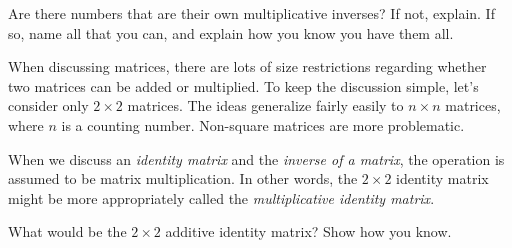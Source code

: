 \documentclass[space,handout,nooutcomes]{ximera}
\begin{document}
\begin{question}
Are there numbers that are their own multiplicative inverses?  If not, explain.  If so, name all that you can, and explain how you know you have them all.
\end{question}

When discussing matrices, there are lots of size restrictions
regarding whether two matrices can be added or multiplied.  To keep
the discussion simple, let's consider only $2\times 2$ matrices.  The
ideas generalize fairly easily to $n\times n$ matrices, where $n$ is a
counting number.  Non-square matrices are more problematic.

When we discuss an \emph{identity matrix} and the \emph{inverse of a
  matrix}, the operation is assumed to be matrix multiplication.  In
other words, the $2\times 2$ identity matrix might be more
appropriately called the \emph{multiplicative identity matrix}.

\begin{question}
What would be the $2\times 2$ additive identity matrix?  Show how you
know.
%
%
%
\end{question}
\end{document}
